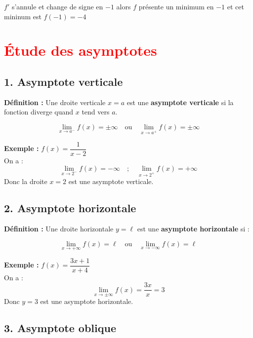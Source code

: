 \documentclass[12pt]{article}
\begin{document}
$f'$ s'annule et change de signe en $-1$ alors $f$ présente un minimum en $-1$ et cet mininum est $f(-1)=-4$

\section*{\textcolor{red}{Étude des asymptotes}}

\subsection*{1. Asymptote verticale}

\begin{tcolorbox}[colback=red!5!white, colframe=red!80!black]
    \textbf{Définition :} Une droite verticale \( x = a \) est une \textbf{asymptote verticale} si la fonction diverge quand \( x \) tend vers \( a \).

    \[
        \lim_{x \to a^-} f(x) = \pm \infty \quad \text{ou} \quad \lim_{x \to a^+} f(x) = \pm \infty
    \]
\end{tcolorbox}

\textbf{Exemple :} \( f(x) = \dfrac{1}{x - 2} \) \\
On a :
\[
    \lim_{x \to 2^-} f(x) = -\infty \quad ; \quad \lim_{x \to 2^+} f(x) = +\infty
\]
Donc la droite \( x = 2 \) est une asymptote verticale.

\vspace{0.5cm}

\subsection*{2. Asymptote horizontale}

\begin{tcolorbox}[colback=red!5!white, colframe=red!80!black]
    \textbf{Définition :} Une droite horizontale \( y = \ell \) est une \textbf{asymptote horizontale} si :

    \[
        \lim_{x \to +\infty} f(x) = \ell \quad \text{ou} \quad \lim_{x \to -\infty} f(x) = \ell
    \]
\end{tcolorbox}

\textbf{Exemple :} \( f(x) = \dfrac{3x + 1}{x + 4} \) \\
On a :
\[
    \lim_{x \to \pm\infty} f(x) = \dfrac{3x}{x} = 3
\]
Donc \( y = 3 \) est une asymptote horizontale.

\vspace{0.5cm}

\subsection*{3. Asymptote oblique}
\end{document}
